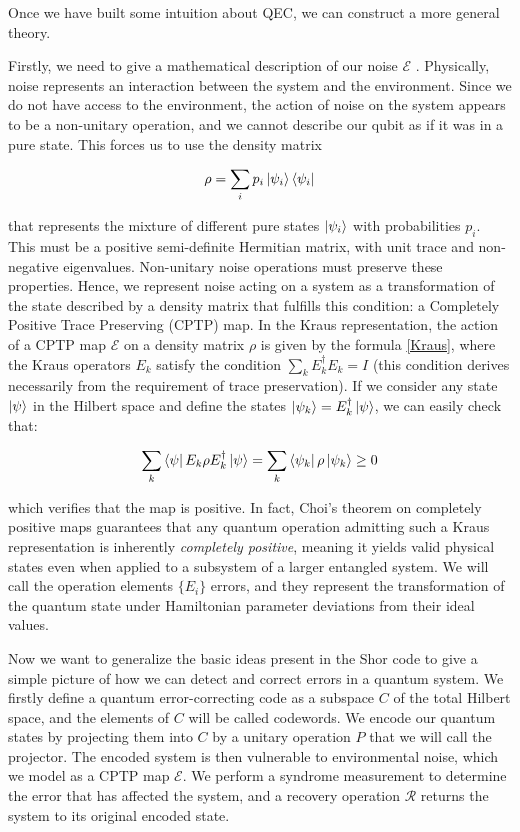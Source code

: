 \documentclass[12pt, twoside, openany]{book}
\begin{document}
Once we have built some intuition about QEC, we can construct a more general theory. 

Firstly, we need to give a mathematical description of our noise $\mathcal{E}$ \cite{Girvin2023}. Physically, noise represents an interaction between the system and the environment. Since we do not have access to the environment, the action of noise on the system appears to be a non-unitary operation, and we cannot describe our qubit as if it was in a pure state. This forces us to use the density matrix 

\begin{equation} \label{density}
    \rho = \sum_i p_i \ket{ \psi_i } \bra{ \psi_i }
\end{equation}

that represents the mixture of different pure states $\ket{ \psi_i }$ with probabilities $p_i$. This must be a positive semi-definite Hermitian matrix, with unit trace and non-negative eigenvalues. Non-unitary noise operations must preserve these properties. Hence, we represent noise acting on a system as a transformation of the state described by a density matrix that fulfills this condition: a Completely Positive Trace Preserving (CPTP) map. In the Kraus representation, the action of a CPTP map $\mathcal{E}$ on a density matrix $\rho$ is given by the formula \ref{Kraus}, where the Kraus operators $E_k$ satisfy the condition $\sum_k E_k^\dagger E_k = I$ (this condition derives necessarily from the requirement of trace preservation). If we consider any state $\ket{\psi}$ in the Hilbert space and define the states $ \ket{\psi _k} = E_k^\dagger \ket{\psi} $, we can easily check that: 

\begin{align*}
    \sum_k \bra{\psi} E_k \rho E_k^\dagger \ket{\psi} = \sum_k \bra{\psi_k} \rho \ket{\psi_k} \geq 0
\end{align*}

which verifies that the map is positive. In fact, Choi's theorem on completely positive maps guarantees that any quantum operation admitting such a Kraus representation is inherently \textit{completely positive}, meaning it yields valid physical states even when applied to a subsystem of a larger entangled system. We will call the operation elements $\{E_i\}$ errors, and they represent the transformation of the quantum state under Hamiltonian parameter deviations from their ideal values. 

Now we want to generalize the basic ideas present in the Shor code to give a simple picture of how we can detect and correct errors in a quantum system. We firstly define a quantum error-correcting code as a subspace $C$ of the total Hilbert space, and the elements of $C$ will be called codewords. We encode our quantum states by projecting them into $C$ by a unitary operation $P$ that we will call the projector. The encoded system is then vulnerable to environmental noise, which we model as a CPTP map $\mathcal{E}$. We perform a syndrome measurement to determine the error that has affected the system, and a recovery operation $\mathcal{R}$ returns the system to its original encoded state. 
\end{document}
